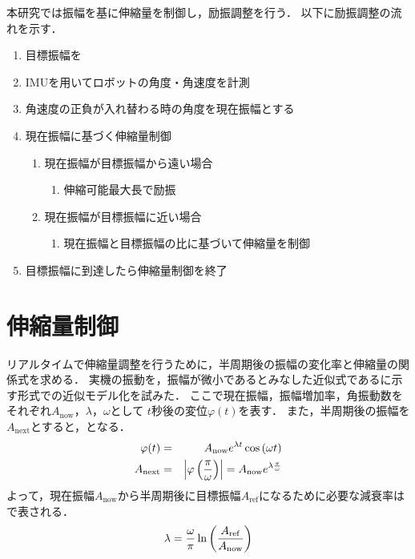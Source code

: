           本研究では振幅を基に伸縮量を制御し，励振調整を行う．
          以下に励振調整の流れを示す．
          \begin{enumerate}
            \item 目標振幅を
            \item IMUを用いてロボットの角度・角速度を計測
            \item 角速度の正負が入れ替わる時の角度を現在振幅とする
            \item 現在振幅に基づく伸縮量制御
            \begin{enumerate}
              \item 現在振幅が目標振幅から遠い場合
              \begin{enumerate}
              \item 伸縮可能最大長で励振
              \end{enumerate}
              \item 現在振幅が目標振幅に近い場合
              \begin{enumerate}
                \item 現在振幅と目標振幅の比に基づいて伸縮量を制御
              \end{enumerate}
            \end{enumerate}
            \item 目標振幅に到達したら伸縮量制御を終了
          \end{enumerate}

          \section{伸縮量制御}

          リアルタイムで伸縮量調整を行うために，半周期後の振幅の変化率と伸縮量の関係式を求める．
          実機の振動を，振幅が微小であるとみなした近似式であるに示す形式での近似モデル化を試みた．
          ここで現在振幅，振幅増加率，角振動数をそれぞれ$A_{\mathrm{now}}$，$\lambda$，$\omega$として
          $t$秒後の変位$\varphi(t)$を表す．
          また，半周期後の振幅を$A_{\mathrm{next}}$とすると，となる．
          \begin{eqnarray}
            \equlabel{Approximation Model}
            \varphi(t)&=&A_{\mathrm{now}}e^{\lambda t}\cos{(\omega t)}\\
            \equlabel{amp rate}
            A_{\mathrm{next}}&=&\left|\varphi\left(\frac{\pi}{\omega}\right)\right|=A_{\mathrm{now}}e^{\lambda \frac{\pi}{\omega}}
          \end{eqnarray}
          よって，現在振幅$A_{\mathrm{now}}$から半周期後に目標振幅$A_{\mathrm{ref}}$になるために必要な減衰率はで表される．
          \begin{eqnarray}
            \equlabel{lambda}
            \lambda=\frac{\omega}{\pi}\ln{\left(\frac{A_{\mathrm{ref}}}{A_{\mathrm{now}}}\right)}
          \end{eqnarray}

